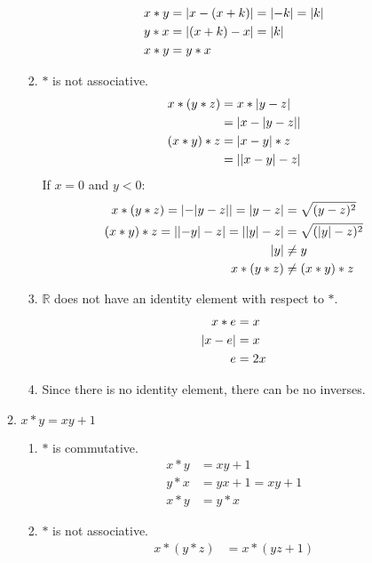 \begin{enumerate}[label={\Alph*.},font={\bfseries}]
\begin{enumerate}[label={\arabic*},font={\bfseries}]
\begin{enumerate}[label={(\roman*)}]
\begin{align*}
              x*y &= \lvert x-(x+k)\rvert = \lvert-k\rvert = \lvert k\rvert\\
              y*x &= \lvert(x+k)-x\rvert = \lvert k\rvert \\
              x*y &= y*x
            \end{align*}
          \item $*$ is not associative.
            \begin{align*}
              x*(y*z) &= x*\lvert y-z\rvert \\
              &= \lvert x-\lvert y-z\rvert\rvert \\
              (x*y)*z &= \lvert x-y\rvert*z \\
              &= \lvert\lvert x-y\rvert-z\rvert \\
            \end{align*}
            If $x=0$ and $y<0$:
            \begin{align*}
              x*(y*z) = \lvert-\lvert y-z\rvert\rvert = \lvert y-z\rvert &= \sqrt{(y-z)^2} \\
              (x*y)*z = \lvert\lvert-y\rvert-z\rvert = \lvert\lvert y\rvert-z\rvert &= \sqrt{(\lvert y\rvert-z)^2} \\
              \lvert y\rvert &\neq y \\
              x*(y*z) &\neq (x*y)*z
            \end{align*}
          \item $\mathbb{R}$ does not have an identity element with respect to $*$.
            \begin{align*}
              x*e &= x \\
              \lvert x-e\rvert &= x \\
              e &= 2x
            \end{align*}
          \item Since there is no identity element, there can be no inverses.
        \end{enumerate}
      \item $x*y=xy+1$
        \begin{enumerate}[label={(\roman*)}]
          \item $*$ is commutative.
            \begin{align*}
              x*y &= xy+1 \\
              y*x &= yx+1 = xy+1 \\
              x*y &= y*x
            \end{align*}
          \item $*$ is not associative.
            \begin{align*}
              x*(y*z) &= x*(yz+1) \\

\end{align*}
\end{enumerate}
\end{enumerate}
\end{enumerate}
